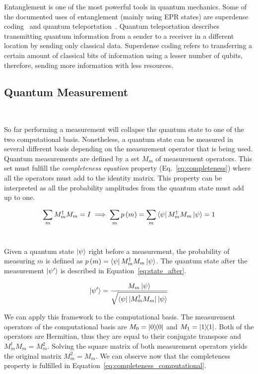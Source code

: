 Entanglement is one of the most powerful tools in quantum mechanics.
Some of the documented uses of entanglement (mainly using EPR states)
are superdense coding~\cite{bennett_communication_1992} and quantum
teleportation~\cite{bennett_teleporting_1993}. Quantum teleportation
describes transmitting quantum information from a sender to a receiver
in a different location by sending only classical data. Superdense
coding refers to transferring a certain amount of classical bits of
information using a lesser number of qubits, therefore, sending more
information with less resources. \

\subsection{Quantum Measurement}\label{subsection:measurement} \

So far performing a measurement will collapse the quantum state to
one of the two computational basis. Nonetheless, a quantum state
can be measured in several different basis depending on the
measurement operator that is being used. Quantum measurements
are defined by a set \(M_m\) of measurement operators. This
set must fulfill the \textit{completeness equation} property
(Eq.~\ref{eq:completeness}) where all the operators must add
to the identity matrix. This property can be interpreted as
all the probability amplitudes from the quantum state must
add up to one. \

\begin{equation}\label{eq:completeness}
    \sum_{m}M_m^{\dag}M_m = I 
    \implies \sum_{m}p\left(m\right) = \sum_{m}\bra{\psi}M_m^{\dag}M_m\ket{\psi} = 1
\end{equation} \

Given a quantum state \(\ket{\psi}\) right before a measurement, the
probability of measuring \(m\) is defined as
\(p\left(m\right) = \bra{\psi}M_m^{\dag}M_m\ket{\psi}\).
The quantum state after the measurement \(\ket{\psi'}\) is described in
Equation~\ref{eq:state_after}. \

\begin{equation}\label{eq:state_after}
  \ket{\psi'} = \frac{M_m\ket{\psi}}{\sqrt{\bra{\psi}|M_m^{\dag}M_m|\ket{\psi}}}
\end{equation}

We can apply this framework to the computational basis. The
measurement operators of the computational basis are
\(M_0 = \ketbra{0}{0}\) and \(M_1 = \ketbra{1}{1}\). Both
of the operators are Hermitian, thus they are equal to their
conjugate transpose and \(M_m^{\dag}M_m = M_m^2\). 
Solving the square matrix of both measurement operators 
yields the original matrix \(M_m^2 = M_m\). We can observe
now that the completeness property is fulfilled in
Equation~\ref{eq:completeness_computational}. \

